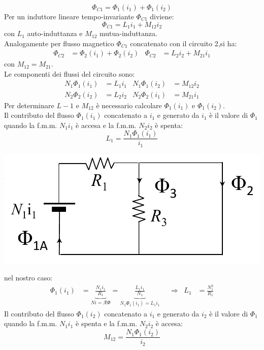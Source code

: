 \documentclass{article}
\begin{document}
\[\Phi_{C1} = \Phi_1(i_1) + \Phi_1(i_2)\]
Per un induttore lineare tempo-invariante $\Phi_{C1}$ diviene:
\[\Phi_{C1} = L_1i_1 + M_{12}i_2\]
con $L_1$ auto-induttanza e $M_{12}$ mutua-induttanza. 
\vspace*{0.2cm}\\
Analogamente per flusso magnetico $\Phi_{C1}$ concatenato con il circuito 2,si ha:
\begin{align*}
    \Phi_{C2} &= \Phi_2(i_1) + \Phi_2(i_2)
    &
    \Phi_{C2} &= L_2i_2 + M_{21}i_1
\end{align*}
con $M_{12} = M_{21}$.
\vspace*{0.2cm}\\
Le componenti dei flussi del circuito sono:
\begin{align*}
    N_1\Phi_1(i_1) &= L_1i_1 & N_1\Phi_1(i_2) &= M_{12}i_2
    \\
    N_2\Phi_2(i_2) &= L_2i_2 & N_2\Phi_2(i_1) &= M_{21}i_1
\end{align*}
Per determinare $L-1$ e $M_{12}$ è necessario calcolare $\Phi_1(i_1)$ e $\Phi_1(i_2)$.\\
Il contributo del flusso $\Phi_1(i_1)$ concatenato a $i_1$ e generato da $i_1$ è il valore di $\Phi_1$ quando la f.m.m. $N_1i_1$ è accesa e la f.m.m. $N_2i_2$ è spenta:
\[L_1 = \frac{N_1\Phi_1(i_1)}{i_1}\]
\begin{center}
    \includegraphics[scale=0.27]{Image/Analisi_circuito_magnetico_2.png}
\end{center}
nel nostro caso:
\begin{align*}
    \Phi_1(i_1) &= \underbrace{\frac{N_1i_1}{R_1}}_{Ni=\mathcal{R}\Phi} = \underbrace{\frac{L_1i_1}{N_1}}_{ N_1\Phi_1(i_1) = L_1i_1}
    &
    &\Longrightarrow
    &
    L_1 &= \frac{N_1^2}{R_1}
\end{align*}
Il contributo del flusso $\Phi_1(i_2)$ concatenato a $i_1$ e generato da $i_2$ è il valore di $\Phi_1$ quando la f.m.m. $N_1i_1$ è spenta e la f.m.m. $N_2i_2$ è accesa:
\[M_{12}=\frac{N_1\Phi_1(i_2)}{i_2}\]
\end{document}

